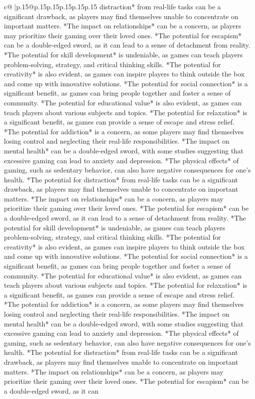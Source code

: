 \documentclass{article}
\begin{document}
{\begin{supertabular}{c@{$\;$}|p{.15\linewidth}@{}p{.15\linewidth}p{.15\linewidth}p{.15\linewidth}p{.15\linewidth}p{.15\linewidth}}
{{{distraction* from real{-}life tasks can be a significant drawback, as players may find themselves unable to concentrate on important matters. *The impact on relationships* can be a concern, as players may prioritize their gaming over their loved ones. *The potential for escapism* can be a double{-}edged sword, as it can lead to a sense of detachment from reality. *The potential for skill development* is undeniable, as games can teach players problem{-}solving, strategy, and critical thinking skills. *The potential for creativity* is also evident, as games can inspire players to think outside the box and come up with innovative solutions. *The potential for social connection* is a significant benefit, as games can bring people together and foster a sense of community. *The potential for educational value* is also evident, as games can teach players about various subjects and topics. *The potential for relaxation* is a significant benefit, as games can provide a sense of escape and stress relief. *The potential for addiction* is a concern, as some players may find themselves losing control and neglecting their real{-}life responsibilities. *The impact on mental health* can be a double{-}edged sword, with some studies suggesting that excessive gaming can lead to anxiety and depression. *The physical effects* of gaming, such as sedentary behavior, can also have negative consequences for one's health. *The potential for distraction* from real{-}life tasks can be a significant drawback, as players may find themselves unable to concentrate on important matters. *The impact on relationships* can be a concern, as players may prioritize their gaming over their loved ones. *The potential for escapism* can be a double{-}edged sword, as it can lead to a sense of detachment from reality. *The potential for skill development* is undeniable, as games can teach players problem{-}solving, strategy, and critical thinking skills. *The potential for creativity* is also evident, as games can inspire players to think outside the box and come up with innovative solutions. *The potential for social connection* is a significant benefit, as games can bring people together and foster a sense of community. *The potential for educational value* is also evident, as games can teach players about various subjects and topics. *The potential for relaxation* is a significant benefit, as games can provide a sense of escape and stress relief. *The potential for addiction* is a concern, as some players may find themselves losing control and neglecting their real{-}life responsibilities. *The impact on mental health* can be a double{-}edged sword, with some studies suggesting that excessive gaming can lead to anxiety and depression. *The physical effects* of gaming, such as sedentary behavior, can also have negative consequences for one's health. *The potential for distraction* from real{-}life tasks can be a significant drawback, as players may find themselves unable to concentrate on important matters. *The impact on relationships* can be a concern, as players may prioritize their gaming over their loved ones. *The potential for escapism* can be a double{-}edged sword, as it can }}}
\end{supertabular}}
\end{document}
